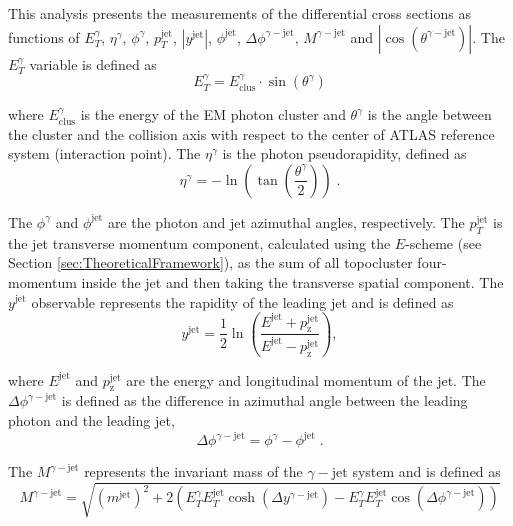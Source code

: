 \documentclass[12pt, twoside]{article}
\numberwithin{equation}{section}
\numberwithin{figure}{section}
\begin{document}
This analysis presents the measurements of the differential cross sections as functions of $E^{\gamma}_{T}$, $\eta^{\gamma}$, $\phi^{\gamma}$, $p^{\text{jet}}_{T}$, $\left| y^{\text{jet}} \right|$, $\phi^{\text{jet}}$, $\Delta \phi^{\gamma-\text{jet}}$, $M^{\gamma-\text{jet}}$ and $\left| \cos \left( \theta^{\gamma-\text{jet}} \right) \right|$. The $E^{\gamma}_{T}$ variable is defined as
\begin{equation}    \label{eq:EtLEAD}
    E^{\gamma}_{T} = E^{\gamma}_{\text{clus}} \cdot \sin \left( \theta^{\gamma} \right)
\end{equation}

where $E^{\gamma}_{\text{clus}}$ is the energy of the EM photon cluster and $\theta^{\gamma}$ is the angle between the cluster and the collision axis with respect to the center of ATLAS reference system (interaction point). The $\eta^{\gamma}$ is the photon pseudorapidity, defined as
\begin{equation}    \label{eq:PhotonPseudorapidity}
    \eta^{\gamma} = - \ln \left( \tan \left( \frac{\theta^{\gamma}}{2} \right) \right) \; .
\end{equation}

The $\phi^{\gamma}$ and $\phi^{\text{jet}}$ are the photon and jet azimuthal angles, respectively. The $p^{\text{jet}}_{T}$ is the jet transverse momentum component, calculated using the $E$-scheme (see Section \ref{sec:TheoreticalFramework}), as the sum of all topocluster four-momentum inside the jet and then taking the transverse spatial component. The $y^{\text{jet}}$ observable represents the rapidity of the leading jet and is defined as
\begin{equation}    \label{eq:JetRapidityDefinition}
    y^{\text{jet}} = \frac{1}{2} \ln \left( \frac{E^{\text{jet}} + p^{\text{jet}}_{\text{z}}}{E^{\text{jet}} - p^{\text{jet}}_{\text{z}}} \right) ,
\end{equation}

where $E^{\text{jet}}$ and $p^{\text{jet}}_{\text{z}}$ are the energy and longitudinal momentum of the jet. The $\Delta \phi^{\gamma-\text{jet}}$ is defined as the difference in azimuthal angle between the leading photon and the leading jet,
\begin{equation}    \label{eq:PhotonJetDeltaPhiDefinition}
    \Delta \phi^{\gamma-\text{jet}} = \phi^{\gamma} - \phi^{\text{jet}} \; .
\end{equation}

The $M^{\gamma-\text{jet}}$ represents the invariant mass of the $\gamma-\text{jet}$ system and is defined as
\begin{equation}    \label{eq:PhotonJetMassDefinition}
    M^{\gamma-\text{jet}} = \sqrt{\left(m^{\text{jet}} \right)^{2} + 2 \left( E^{\gamma}_{T} E^{\text{jet}}_{T} \cosh \left( \Delta y^{\gamma-\text{jet}} \right) - E^{\gamma}_{T} E^{\text{jet}}_{T} \cos \left( \Delta \phi^{\gamma-\text{jet}} \right) \right)}
\end{equation}
\end{document}
